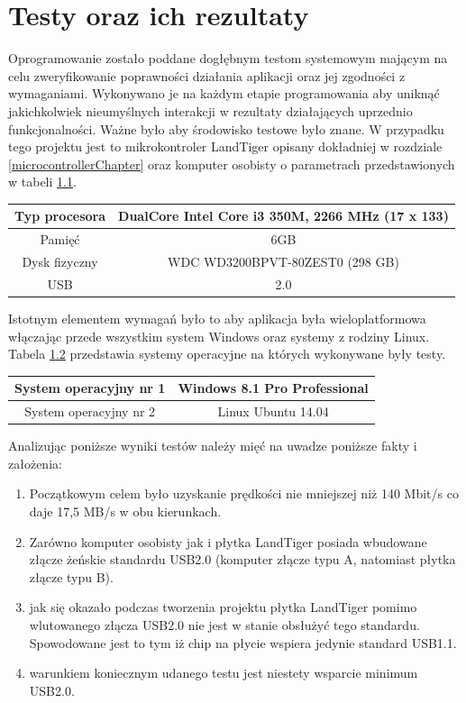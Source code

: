 \documentclass{BscUS}
\begin{document}
\chapter{Testy oraz ich rezultaty}
\label{resultsChapter}
\indent Oprogramowanie zostało poddane dogłębnym testom systemowym mającym na celu zweryfikowanie poprawności działania aplikacji oraz jej zgodności z wymaganiami. Wykonywano je na każdym etapie programowania aby uniknąć jakichkolwiek nieumyślnych interakcji w rezultaty działających uprzednio funkcjonalności. Ważne było aby środowisko testowe było znane. W przypadku tego projektu jest to mikrokontroler LandTiger opisany dokładniej w rozdziale \ref{microcontrollerChapter} oraz komputer osobisty o parametrach przedstawionych w tabeli \ref{tbl:pcParameters}.
\begin{table}[H]
\centering
\begin{tabular}{|c|c|}
\hline
	\rowcolor[gray]{0.8}
	Typ procesora & DualCore Intel Core i3 350M, 2266 MHz (17 x 133) \\ \hline
	
	Pamięć & 6GB \\ \hline
	 \rowcolor[gray]{0.8}
	 Dysk fizyczny & WDC WD3200BPVT-80ZEST0  (298 GB) \\ \hline
	USB & 2.0 \\ \hline
\end{tabular}
\label{tbl:pcParameters}
\end{table}
\noindent Istotnym elementem wymagań było to aby aplikacja była wieloplatformowa włączając przede wszystkim system Windows oraz systemy z rodziny Linux. Tabela \ref{tbl:operationalSystems} przedstawia systemy operacyjne na których wykonywane były testy.
\begin{table}[H]
\centering
\begin{tabular}{|c|c|}
\hline
	\rowcolor[gray]{0.8}
	System operacyjny nr 1 & Windows 8.1 Pro Professional \\ \hline
	System operacyjny nr 2  & Linux Ubuntu 14.04 \\ \hline
\end{tabular}
\label{tbl:operationalSystems}
\end{table}
\noindent Analizując poniższe wyniki testów należy mięć na uwadze poniższe fakty i założenia:
\begin{enumerate}
\item Początkowym celem było uzyskanie prędkości nie mniejszej niż 140 Mbit/s co daje 17,5 MB/s w obu kierunkach.
\item Zarówno komputer osobisty jak i płytka LandTiger posiada wbudowane złącze żeńskie standardu USB2.0 (komputer złącze typu A, natomiast płytka złącze typu B).
\item jak się okazało podczas tworzenia projektu płytka LandTiger pomimo wlutowanego złącza USB2.0 nie jest w stanie obsłużyć tego standardu. Spowodowane jest to tym iż chip na płycie wspiera jedynie standard USB1.1.
\item warunkiem koniecznym udanego testu jest niestety wsparcie minimum USB2.0.
\end{enumerate}
\end{document}
